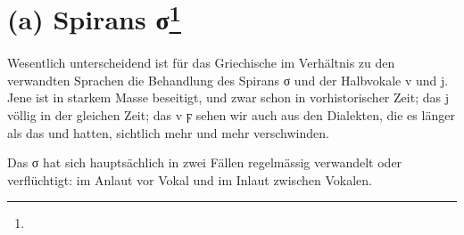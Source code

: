 \section[(a) Spirans σ]{(a) Spirans σ\protect\footnote{}}


\paragraph{} Wesentlich unterscheidend ist für das Griechische im Verhältnis zu
den verwandten Sprachen die Behandlung des Spirans σ und der Halbvokale v und j.
Jene ist in starkem Masse beseitigt, und zwar schon in vorhistorischer Zeit; das
j völlig in der gleichen Zeit; das v ϝ sehen wir auch aus den Dialekten, die es
länger als das  und  hatten, sichtlich mehr und mehr verschwinden. 

Das σ hat sich hauptsächlich in zwei Fällen regelmässig verwandelt oder verflüchtigt: im Anlaut vor Vokal und im Inlaut zwischen Vokalen. 

